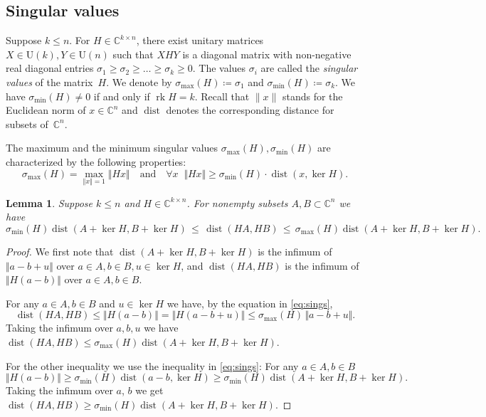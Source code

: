 \documentclass[10pt,a4paper]{article}
\newtheorem{lemma}[theorem]{Lemma}
\theoremstyle{definition}
\DeclareMathOperator{\rk}{rk}
\DeclareMathOperator{\dist}{dist}
\newcommand{\CC}{\mathbb{C}}
\numberwithin{equation}{section}
\begin{document}
\subsection{Singular values}
Suppose $k\leq n$. For $H\in\CC^{k\times n}$, there exist unitary matrices
$X\in\mathrm{U}(k), Y\in \mathrm{U}(n)$
such that $XHY$ is a diagonal matrix with non-negative real diagonal entries
$\sigma_1\geq\sigma_2\geq\dots\geq\sigma_k\geq 0$.
The values $\sigma_i$ are called the \textit{singular values} of the matrix~$H$.
We denote by $\sigma_{\max}(H)\coloneqq\sigma_1$ and $\sigma_{\min}(H)\coloneqq\sigma_k$.
We have $\sigma_{\min}(H)\neq 0$ if and only if $\rk H=k$.
Recall that $\|x\|$ stands for the Euclidean norm of $x\in\CC^n$
and $\dist$ denotes the corresponding distance for subsets of~$\CC^n$.

The maximum and the minimum singular values $\sigma_{\max}(H), \sigma_{\min}(H)$
are characterized by the following properties:
\begin{equation}\label{eq:sings}
	\sigma_{\max}(H) = \max_{\Vert x\Vert =1} \Vert Hx\Vert
	\quad\text{and}\quad
       \forall x \;\; \Vert Hx\Vert\geq\sigma_{\min}(H)\cdot \dist(x, \ker H).
\end{equation}

\begin{lemma}
\label{lem:sing-value-inequality}
Suppose $k\leq n$ and $H\in\CC^{k\times n}$.
For nonempty subsets $A,B\subset\CC^n$ we have
\[
 \sigma_{\min}(H)\dist(A+\ker H,B+\ker H)\,\leq\,\dist(HA, HB)\,\leq\,\sigma_{\max}(H) \dist(A+\ker H,B+\ker H).
\]
\end{lemma}

\begin{proof}
We first note that $\dist(A+\ker H, B+\ker H)$ is the infimum of $\Vert a-b+u\Vert$ over $a\in A, b\in B, u \in \ker H$,
and
$\dist(HA,HB)$ is the infimum of $\Vert H(a-b)\Vert$ over $a\in A, b\in B$.

For any $a\in A, b\in B$ and $u\in \ker H$ we have, by the equation in \eqref{eq:sings},
\[
 \dist(HA, HB) \leq \Vert H(a-b)\Vert = \Vert H(a-b+u)\Vert \leq \sigma_{\max}(H)\, \Vert a-b+u\Vert.
\]
Taking the infimum over $a,b,u$ we have $\dist(HA,HB)\leq \sigma_{\max}(H)\dist(A+\ker H, B+\ker H)$.

For the other inequality we use the inequality in \eqref{eq:sings}: For any $a\in A, b\in B$
\[
 \Vert H(a-b)\Vert \geq \sigma_{\min}(H) \dist( a-b, \ker H ) \geq \sigma_{\min}(H) \dist(A+\ker H, B+\ker H).
\]
Taking the infimum over $a$, $b$ we get $\dist(HA,HB)\geq \sigma_{\min}(H)\dist(A+\ker H, B+\ker H)$.
\end{proof}
\end{document}
